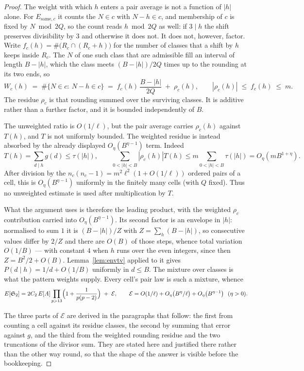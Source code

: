 \documentclass[11pt,a4paper]{article}
\theoremstyle{plain}
\theoremstyle{definition}
\theoremstyle{remark}
\renewcommand{\SS}{\mathfrak{S}}
\begin{document}
\begin{proof}
The weight with which $h$ enters a pair average is not a function of
$|h|$ alone. For $E_{\mathrm{same},c}$ it counts the $N\in c$ with
$N-h\in c$, and membership of $c$ is fixed by $N\bmod 2Q$, so the count
reads $h\bmod 2Q$ as well: if $3\mid h$ the shift preserves divisibility
by $3$ and otherwise it does not. It does not, however, factor. Write
$f_c(h)=\#\bigl(R_c\cap(R_c+h)\bigr)$ for the number of classes that a
shift by $h$ keeps inside $R_c$. The $N$ of one such class that are
admissible fill an interval of length $B-|h|$, which the class meets
$(B-|h|)/2Q$ times up to the rounding at its two ends, so
\[
  W_c(h)\;=\;\#\{N\in c:\ N-h\in c\}
  \;=\;f_c(h)\,\frac{B-|h|}{2Q}\;+\;\rho_c(h),
  \qquad
  |\rho_c(h)|\;\le\;f_c(h)\;\le\;m .
\]
The residue $\rho_c$ is that rounding summed over the surviving classes.
It is additive rather than a further factor, and it is bounded
independently of $B$.

The unweighted ratio is $O(1/\ell)$, but the pair average carries
$\rho_c(h)$ against $T(h)$, and $T$ is not uniformly bounded. The
weighted residue is instead absorbed by the already displayed
$O_\eta(B^{\eta-1})$ term. Indeed
\[
  T(h)=\sum_{d\mid h}g(d)\leq\tau(|h|),\qquad
  \sum_{0<|h|<B}|\rho_c(h)|T(h)
  \leq m\sum_{0<|h|<B}\tau(|h|)=O_\eta(mB^{1+\eta}).
\]
After division by the $n_c(n_c-1)=m^2\ell^2(1+O(1/\ell))$ ordered pairs
of a cell, this is
$O_\eta(B^{\eta-1})$ uniformly in the finitely many cells (with $Q$
fixed). Thus no unweighted estimate is used after multiplication by
$T$.

What the argument uses is therefore the leading product, with the
weighted $\rho_c$ contribution carried into $O_\eta(B^{\eta-1})$. Its
second factor is an envelope in $|h|$:
normalised to sum $1$ it is $(B-|h|)/Z$ with $Z=\sum_h(B-|h|)$, so
consecutive values differ by $2/Z$ and there are $O(B)$ of those steps,
whence total variation $O(1/B)$ --- with constant $4$ when $h$ runs over
the even integers, since then $Z=B^2/2+O(B)$. Lemma~\ref{lem:envtv}
applied to it gives $P(d\mid h)=1/d+O(1/B)$ uniformly in $d\le B$. The
mixture over classes is what the pattern weights supply. Every cell's
pair law is such a mixture, whence
\[
  E[\SS_2]=2C_2\,E[A]\prod_{p>13}\Bigl(1+\frac1{p(p-2)}\Bigr)
  \;+\;\mathcal E,
  \qquad
  \mathcal E=O(1/\ell)+O_\eta\bigl(B^{\eta}/\ell\bigr)
    +O_\eta\bigl(B^{\eta-1}\bigr)\ \ (\eta>0).
\]

The three parts of $\mathcal E$ are derived in the paragraphs that
follow: the first from counting a cell against its residue classes, the
second by summing that error against $g$, and the third from the weighted
rounding residue and the two truncations of the divisor sum. They are
stated here and justified there rather than the other way round, so that
the shape of the answer is visible before the bookkeeping.


\end{proof}
\end{document}

